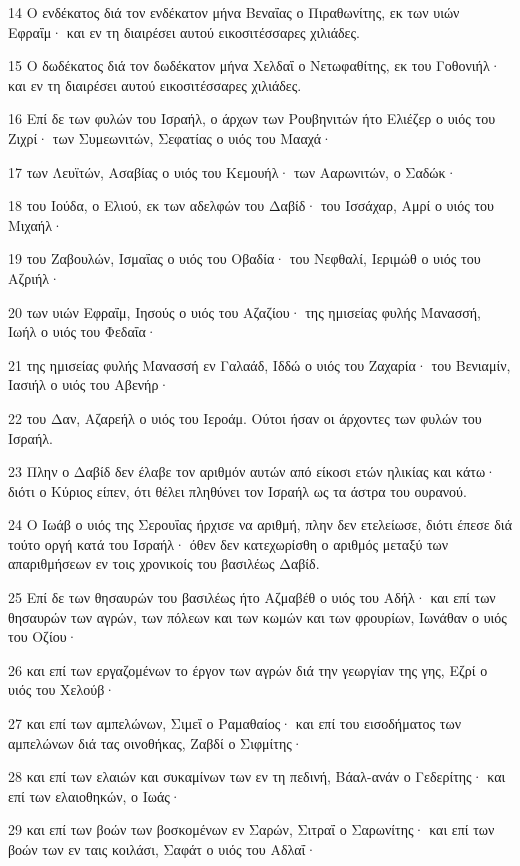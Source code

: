 \par 14 Ο ενδέκατος διά τον ενδέκατον μήνα Βεναΐας ο Πιραθωνίτης, εκ των υιών Εφραΐμ· και εν τη διαιρέσει αυτού εικοσιτέσσαρες χιλιάδες.
\par 15 Ο δωδέκατος διά τον δωδέκατον μήνα Χελδαΐ ο Νετωφαθίτης, εκ του Γοθονιήλ· και εν τη διαιρέσει αυτού εικοσιτέσσαρες χιλιάδες.
\par 16 Επί δε των φυλών του Ισραήλ, ο άρχων των Ρουβηνιτών ήτο Ελιέζερ ο υιός του Ζιχρί· των Συμεωνιτών, Σεφατίας ο υιός του Μααχά·
\par 17 των Λευϊτών, Ασαβίας ο υιός του Κεμουήλ· των Ααρωνιτών, ο Σαδώκ·
\par 18 του Ιούδα, ο Ελιού, εκ των αδελφών του Δαβίδ· του Ισσάχαρ, Αμρί ο υιός του Μιχαήλ·
\par 19 του Ζαβουλών, Ισμαΐας ο υιός του Οβαδία· του Νεφθαλί, Ιεριμώθ ο υιός του Αζριήλ·
\par 20 των υιών Εφραΐμ, Ιησούς ο υιός του Αζαζίου· της ημισείας φυλής Μανασσή, Ιωήλ ο υιός του Φεδαΐα·
\par 21 της ημισείας φυλής Μανασσή εν Γαλαάδ, Ιδδώ ο υιός του Ζαχαρία· του Βενιαμίν, Ιασιήλ ο υιός του Αβενήρ·
\par 22 του Δαν, Αζαρεήλ ο υιός του Ιεροάμ. Ούτοι ήσαν οι άρχοντες των φυλών του Ισραήλ.
\par 23 Πλην ο Δαβίδ δεν έλαβε τον αριθμόν αυτών από είκοσι ετών ηλικίας και κάτω· διότι ο Κύριος είπεν, ότι θέλει πληθύνει τον Ισραήλ ως τα άστρα του ουρανού.
\par 24 Ο Ιωάβ ο υιός της Σερουΐας ήρχισε να αριθμή, πλην δεν ετελείωσε, διότι έπεσε διά τούτο οργή κατά του Ισραήλ· όθεν δεν κατεχωρίσθη ο αριθμός μεταξύ των απαριθμήσεων εν τοις χρονικοίς του βασιλέως Δαβίδ.
\par 25 Επί δε των θησαυρών του βασιλέως ήτο Αζμαβέθ ο υιός του Αδήλ· και επί των θησαυρών των αγρών, των πόλεων και των κωμών και των φρουρίων, Ιωνάθαν ο υιός του Οζίου·
\par 26 και επί των εργαζομένων το έργον των αγρών διά την γεωργίαν της γης, Εζρί ο υιός του Χελούβ·
\par 27 και επί των αμπελώνων, Σιμεΐ ο Ραμαθαίος· και επί του εισοδήματος των αμπελώνων διά τας οινοθήκας, Ζαβδί ο Σιφμίτης·
\par 28 και επί των ελαιών και συκαμίνων των εν τη πεδινή, Βάαλ-ανάν ο Γεδερίτης· και επί των ελαιοθηκών, ο Ιωάς·
\par 29 και επί των βοών των βοσκομένων εν Σαρών, Σιτραΐ ο Σαρωνίτης· και επί των βοών των εν ταις κοιλάσι, Σαφάτ ο υιός του Αδλαΐ·
